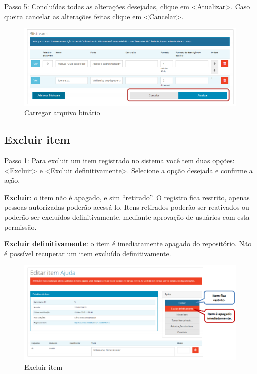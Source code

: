 \documentclass[12pt,hidelinks]{article}
\begin{document}
\newpage
    
    Passo 5: Concluídas todas as alterações desejadas, clique em <Atualizar>. Caso queira cancelar as alterações feitas clique em <Cancelar>.
    
    \begin{figure}[!htp]
                \centering
                \includegraphics[scale=0.8]{figura/Figura99.png}
                \caption{Carregar arquivo binário}
            \label{Rotulo}
        \end{figure}
    
    \subsection{Excluir item}
    
    Passo 1: Para excluir um item registrado no sistema você tem duas opções: <Excluir> e <Excluir definitivamente>. Selecione a opção desejada e confirme a ação.
    
    \singlespacing
     
     \textbf{Excluir}: o item não é apagado, e sim “retirado”. O registro fica restrito, apenas pessoas autorizadas poderão acessá-lo. Itens retirados poderão ser reativados ou poderão ser excluídos definitivamente, mediante aprovação de usuários com esta permissão.
     
     \singlespacing
     
    \textbf{Excluir definitivamente}: o item é imediatamente apagado do repositório. Não é possível  recuperar um item excluído definitivamente.
    
    \begin{figure}[!htp]
                \centering
                \includegraphics[scale=0.8]{figura/Figura100.png}
                \caption{Excluir item}
            \label{Rotulo}
        \end{figure}
\end{document}
